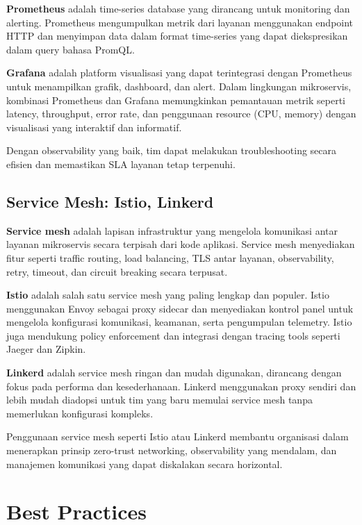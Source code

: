 \textbf{Prometheus} adalah time-series database yang dirancang untuk monitoring dan alerting. Prometheus mengumpulkan metrik dari layanan menggunakan endpoint HTTP dan menyimpan data dalam format time-series yang dapat diekspresikan dalam query bahasa PromQL.

\textbf{Grafana} adalah platform visualisasi yang dapat terintegrasi dengan Prometheus untuk menampilkan grafik, dashboard, dan alert. Dalam lingkungan mikroservis, kombinasi Prometheus dan Grafana memungkinkan pemantauan metrik seperti latency, throughput, error rate, dan penggunaan resource (CPU, memory) dengan visualisasi yang interaktif dan informatif.

Dengan observability yang baik, tim dapat melakukan troubleshooting secara efisien dan memastikan SLA layanan tetap terpenuhi.

\subsection{Service Mesh: Istio, Linkerd}

\textbf{Service mesh} adalah lapisan infrastruktur yang mengelola komunikasi antar layanan mikroservis secara terpisah dari kode aplikasi. Service mesh menyediakan fitur seperti traffic routing, load balancing, TLS antar layanan, observability, retry, timeout, dan circuit breaking secara terpusat.

\textbf{Istio} adalah salah satu service mesh yang paling lengkap dan populer. Istio menggunakan Envoy sebagai proxy sidecar dan menyediakan kontrol panel untuk mengelola konfigurasi komunikasi, keamanan, serta pengumpulan telemetry. Istio juga mendukung policy enforcement dan integrasi dengan tracing tools seperti Jaeger dan Zipkin.

\textbf{Linkerd} adalah service mesh ringan dan mudah digunakan, dirancang dengan fokus pada performa dan kesederhanaan. Linkerd menggunakan proxy sendiri dan lebih mudah diadopsi untuk tim yang baru memulai service mesh tanpa memerlukan konfigurasi kompleks.

Penggunaan service mesh seperti Istio atau Linkerd membantu organisasi dalam menerapkan prinsip zero-trust networking, observability yang mendalam, dan manajemen komunikasi yang dapat diskalakan secara horizontal.


\section{Best Practices}

